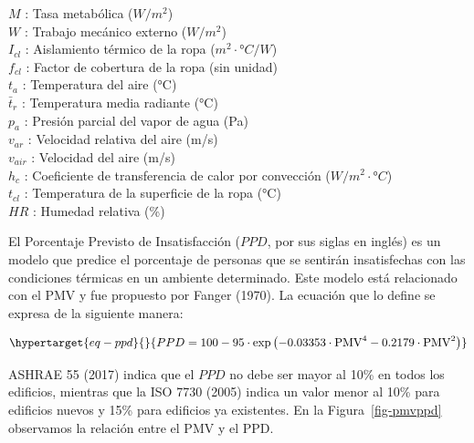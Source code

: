 \documentclass[
  12pt,
  letterpaper,
  DIV=11,
  numbers=noendperiod]{scrreport}
\begin{document}
\(M\) : Tasa metabólica (\(W/m^2\))\\
\(W\) : Trabajo mecánico externo (\(W/m^2\))\\
\(I_{cl}\) : Aislamiento térmico de la ropa (\(m^2 \cdot °C/W\))\\
\(f_{cl}\) : Factor de cobertura de la ropa (sin unidad)\\
\(t_a\) : Temperatura del aire (°C)\\
\(\bar{t}_r\) : Temperatura media radiante (°C)\\
\(p_a\) : Presión parcial del vapor de agua (Pa)\\
\(v_{ar}\) : Velocidad relativa del aire (m/s)\\
\(v_{air}\) : Velocidad del aire (m/s)\\
\(h_c\) : Coeficiente de transferencia de calor por convección
(\(W/m^2 \cdot °C\))\\
\(t_{cl}\) : Temperatura de la superficie de la ropa (°C)\\
\(HR\) : Humedad relativa (\%)

El Porcentaje Previsto de Insatisfacción (\(PPD\), por sus siglas en
inglés) es un modelo que predice el porcentaje de personas que se
sentirán insatisfechas con las condiciones térmicas en un ambiente
determinado. Este modelo está relacionado con el PMV y fue propuesto por
Fanger (1970). La ecuación que lo define se expresa de la siguiente
manera:

\begin{equation}\protect\hypertarget{eq-ppd}{}{
PPD = 100 - 95 \cdot \exp\left(-0.03353 \cdot \text{PMV}^4 - 0.2179 \cdot \text{PMV}^2\right)
}\label{eq-ppd}\end{equation}

ASHRAE 55 (2017) indica que el \(PPD\) no debe ser mayor al 10\% en
todos los edificios, mientras que la ISO 7730 (2005) indica un valor
menor al 10\% para edificios nuevos y 15\% para edificios ya existentes.
En la Figura~\ref{fig-pmvppd} observamos la relación entre el PMV y el
PPD.
\end{document}

